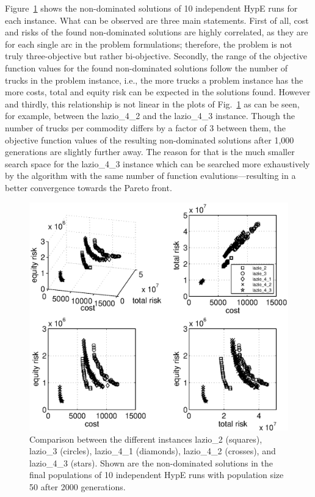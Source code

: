 \documentclass[preprint,12pt]{elsarticle}
\begin{document}
Figure~\ref{fig:compareAll} shows the non-dominated solutions of 10 independent HypE runs for each instance. What can be observed are three main statements. First of all, cost and risks of the found non-dominated solutions are highly correlated, as they are for each single arc in the problem formulations; therefore, the problem is not truly three-objective but rather bi-objective. Secondly, the range of the objective function values for the found non-dominated solutions follow the number of trucks in the problem instance, i.e., the more trucks a problem instance has the more costs, total and equity risk can be expected in the solutions found. However and thirdly, this relationship is not linear in the plots of Fig.~\ref{fig:compareAll} as can be seen, for example, between the lazio\_4\_2 and the lazio\_4\_3 instance. Though the number of trucks per commodity differs by a factor of 3 between them, the objective function values of the resulting non-dominated solutions after 1,000 generations are slightly further away. The reason for that is the much smaller search space for the lazio\_4\_3 instance which can be searched more exhaustively by the algorithm with the same number of function evalutions---resulting in a better convergence towards the Pareto front.

\begin{figure}
	\centering
	\includegraphics[width=0.75\columnwidth]{../experiments/randVsCost/compAll_2000gens.eps}
	\caption{\label{fig:compareAll} Comparison between the different instances lazio\_2 (squares), lazio\_3 (circles), lazio\_4\_1 (diamonds), lazio\_4\_2 (crosses), and lazio\_4\_3 (stars). Shown are the non-dominated solutions in the final populations of 10 independent HypE runs with population size 50 after 2000 generations.}
\end{figure}
\end{document}
